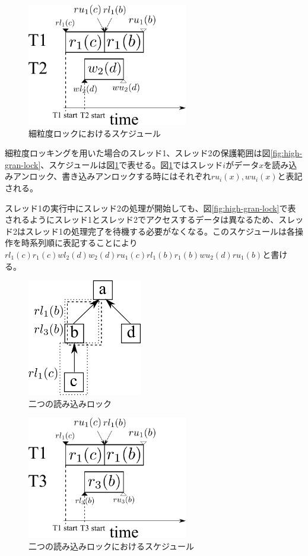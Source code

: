 \documentclass[a4paper]{jreport}	%
\begin{document}
\begin{figure}[h] 
\centering
\includegraphics[width=7cm]{high-gran-time}
\caption{細粒度ロックにおけるスケジュール}
\label{fig:high-gran-time}
\end{figure}



細粒度ロッキングを用いた場合のスレッド1、スレッド2の保護範囲は図\ref{fig:high-gran-lock}、スケジュールは図\ref{fig:high-gran-time}で表せる。図\ref{fig:high-gran-time}ではスレッド$i$がデータ$x$を読み込みアンロック、書き込みアンロックする時にはそれぞれ$ru_i(x), wu_i(x)$と表記される。

スレッド1の実行中にスレッド2の処理が開始しても、図\ref{fig:high-gran-lock}で表されるようにスレッド1とスレッド2でアクセスするデータは異なるため、スレッド2はスレッド1の処理完了を待機する必要がなくなる。このスケジュールは各操作を時系列順に表記することにより$rl_1(c)r_1(c)wl_2(d)w_2(d)ru_1(c)rl_1(b)r_1(b)wu_2(d)ru_1(b)$と書ける。


\begin{figure}[h] 
\centering
\includegraphics[width=5cm]{two-read-lock}
\caption{二つの読み込みロック}
\label{fig:two-read-lock}
\end{figure}


\begin{figure}[h] 
\centering
\includegraphics[width=7cm]{two-read-lock-time}
\caption{二つの読み込みロックにおけるスケジュール}
\label{fig:two-read-lock-time}
\end{figure}
\end{document}
